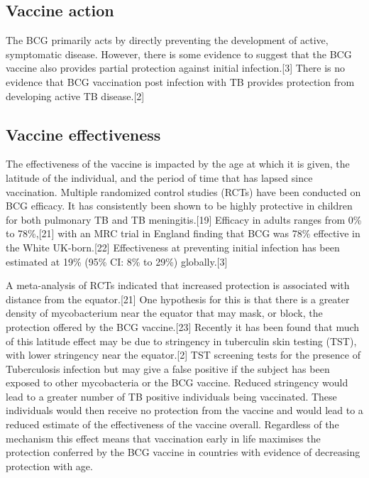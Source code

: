 \documentclass[11pt,twoside]{bristolthesis}
\begin{document}
  \hypertarget{vaccine-action}{%
  \subsection{Vaccine action}\label{vaccine-action}}
  
  The BCG primarily acts by directly preventing the development of active, symptomatic disease. However, there is some evidence to suggest that the BCG vaccine also provides partial protection against initial infection.{[}3{]} There is no evidence that BCG vaccination post infection with TB provides protection from developing active TB disease.{[}2{]}
  
  \hypertarget{vaccine-effectiveness}{%
  \subsection{Vaccine effectiveness}\label{vaccine-effectiveness}}
  
  The effectiveness of the vaccine is impacted by the age at which it is given, the latitude of the individual, and the period of time that has lapsed since vaccination. Multiple randomized control studies (RCTs) have been conducted on BCG efficacy. It has consistently been shown to be highly protective in children for both pulmonary TB and TB meningitis.{[}19{]} Efficacy in adults ranges from 0\% to 78\%,{[}21{]} with an MRC trial in England finding that BCG was 78\% effective in the White UK-born.{[}22{]} Effectiveness at preventing initial infection has been estimated at 19\% (95\% CI: 8\% to 29\%) globally.{[}3{]}
  
  A meta-analysis of RCTs indicated that increased protection is associated with distance from the equator.{[}21{]} One hypothesis for this is that there is a greater density of mycobacterium near the equator that may mask, or block, the protection offered by the BCG vaccine.{[}23{]} Recently it has been found that much of this latitude effect may be due to stringency in tuberculin skin testing (TST), with lower stringency near the equator.{[}2{]} TST screening tests for the presence of Tuberculosis infection but may give a false positive if the subject has been exposed to other mycobacteria or the BCG vaccine. Reduced stringency would lead to a greater number of TB positive individuals being vaccinated. These individuals would then receive no protection from the vaccine and would lead to a reduced estimate of the effectiveness of the vaccine overall. Regardless of the mechanism this effect means that vaccination early in life maximises the protection conferred by the BCG vaccine in countries with evidence of decreasing protection with age.
  
\end{document}

